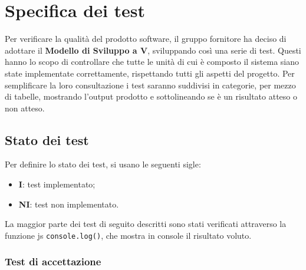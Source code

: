 \section{Specifica dei test}
Per verificare la qualità del prodotto software, il gruppo fornitore ha deciso di adottare il \textbf{Modello di Sviluppo a V}\glo, sviluppando così una serie di test. Questi hanno lo scopo di controllare che tutte le unità di cui è composto il sistema siano state implementate correttamente, rispettando tutti gli aspetti del progetto.
Per semplificare la loro consultazione i test saranno suddivisi in categorie, per mezzo di tabelle, mostrando l'output prodotto e sottolineando se è un risultato atteso o non atteso.
\subsection{Stato dei test}
Per definire lo stato dei test, si usano le seguenti sigle:
\begin{itemize}
\item \textbf{I}: test implementato;
\item \textbf{NI}: test non implementato.
\end{itemize}

La maggior parte dei test di seguito descritti sono stati verificati attraverso la funzione js \texttt{console.log()}, che mostra in console il risultato voluto.

\subsubsection{Test di accettazione}


